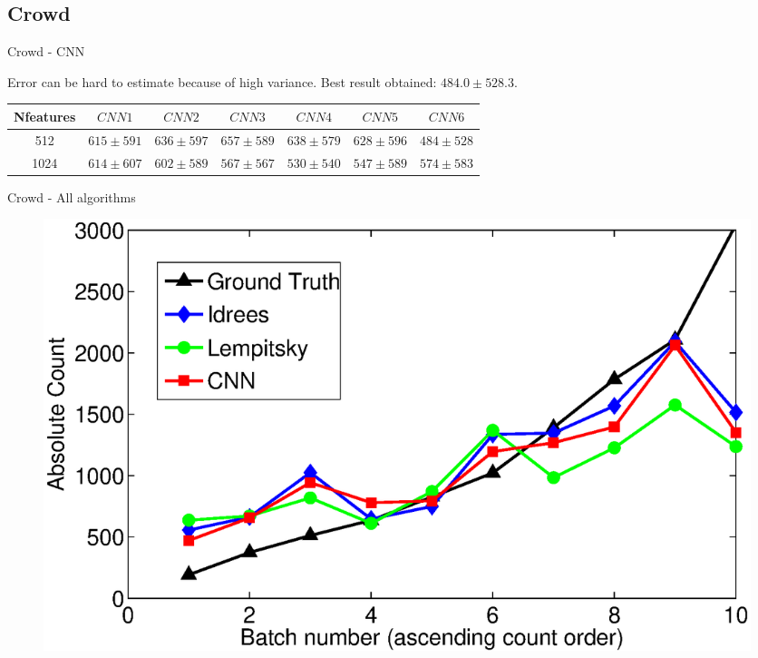 \documentclass[11pt)]{beamer}
\begin{document}
\subsection{Crowd}

\begin{frame}{Crowd - CNN}

Error can be hard to estimate because of high variance. Best result obtained: $484.0 \pm 528.3$.

\begin{table}
\tiny

\begin{tabular}{@{}|c|c|c|c|c|c|c|@{}}
\hline
Nfeatures & $CNN 1$ & $CNN 2$ & $CNN 3$ & $CNN 4$ & $CNN 5$ & $CNN 6$ \\ \hline
512 & $615 \pm 591$ & $636 \pm 597$ & $657 \pm 589$ & $638 \pm 579$ & $628 \pm 596$ & $484 \pm 528$ \\ \hline
1024 & $614 \pm 607$ & $ 602 \pm 589$ & $567 \pm 567$ & $530 \pm 540$ & $547 \pm 589$ & $574 \pm 583$ \\ \hline
\end{tabular}
\normalsize
\end{table}

\end{frame}

\begin{frame}{Crowd - All algorithms}
\begin{figure}
\includegraphics[width=\textwidth]{good_compare.eps}
\end{figure}
\end{frame}
\end{document}
